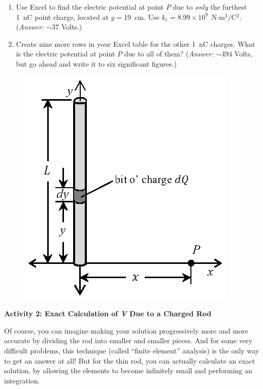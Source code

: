 \begin{enumerate}[labparts]

\item Use Excel to find the electric potential at point $P$ due to \textit{only} the furthest 1~nC point charge, located at $y=19$~cm.  Use $k_e=8.99 \times 10^9$~N$\cdot$m$^2/$C$^2$.  (\textit{Answer:} $\sim 37$ Volts.)
\answerspace{0.5in}

\item Create nine more rows in your Excel table for the other 1~nC charges.  What is the electric potential at point $P$ due to all of them?  (\textit{Answer:} $\sim 494$ Volts, but go ahead and write it to six significant figures.) 
\answerspace{0.5in}

\end{enumerate}

\begin{figure}
\includegraphics[scale=0.9]{potential_charge_distributions/rod_integral.eps}
\end{figure}
\textbf{Activity 2: Exact Calculation of \textit{V} Due to a Charged Rod}

Of course, you can imagine making your solution progressively more and more accurate by dividing the rod into smaller and smaller pieces.  And for some very difficult problems, this technique (called ``finite element'' analysis) is the only way to get an answer at all!  But for the thin rod, you can actually calculate an exact solution, by allowing the elements to become infinitely small and performing an integration.

